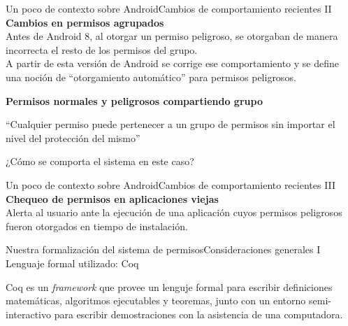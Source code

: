 \documentclass[pdf, handout]{beamer} %
\begin{document}
\begin{frame}{Un poco de contexto sobre Android}{Cambios de comportamiento recientes II}
    \textbf{Cambios en permisos agrupados} \\
    \vspace{10px}
    Antes de Android 8, al otorgar un permiso peligroso, se otorgaban de manera incorrecta el resto
    de los permisos del grupo.\\
    \vspace{5px}
    A partir de esta versión de Android se corrige ese comportamiento y se define una noción de
    ``otorgamiento automático'' para permisos peligrosos.

    \vspace{10px} \pause
    \textbf{Permisos normales y peligrosos compartiendo grupo} \\
    \begin{block}{}
        ``Cualquier permiso puede pertenecer a un grupo de permisos sin importar el nivel del
        protección del mismo''
    \end{block}
    \pause
    ¿Cómo se comporta el sistema en este caso?
\end{frame}

\begin{frame}{Un poco de contexto sobre Android}{Cambios de comportamiento recientes III}
    \textbf{Chequeo de permisos en aplicaciones viejas} \\
    \vspace{10px}
    Alerta al usuario ante la ejecución de una aplicación cuyos permisos peligrosos fueron otorgados
    en tiempo de instalación.
\end{frame}

\begin{frame}{Nuestra formalización del sistema de permisos}{Consideraciones generales I}
    Lenguaje formal utilizado: Coq
    \vspace{10px}
    \begin{block}{}
        Coq es un \textit{framework} que provee un lenguje formal para escribir definiciones
        matemáticas, algoritmos ejecutables y teoremas, junto con un entorno semi-interactivo para
        escribir demostraciones con la asistencia de una computadora.
    \end{block}
\end{frame}
\end{document}

